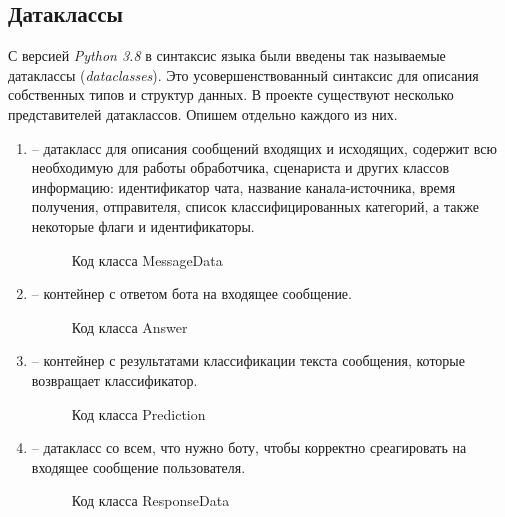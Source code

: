     \subsection{Датаклассы}
    С версией \textit{Python 3.8} в синтаксис языка были введены так называемые
    датаклассы (\textit{dataclasses}).
    Это усовершенствованный синтаксис для описания собственных типов и структур данных.
    В проекте существуют несколько представителей датаклассов. Опишем отдельно каждого из них.
    \begin{enumerate}
        \item {} -- датакласс для описания сообщений входящих и исходящих,
        содержит всю необходимую для работы обработчика, сценариста и других классов информацию:
        идентификатор чата, название канала-источника, время получения, отправителя,
        список классифицированных категорий, а также некоторые флаги и идентификаторы.

        \begin{figure}[!h]
            \centering
            
            \caption{Код класса MessageData}
            \label{fig:messagedata}
        \end{figure}

        \item {} -- контейнер с ответом бота на входящее сообщение.

        \begin{figure}[!h]
            \centering
            
            \caption{Код класса Answer}
            \label{fig:answer}
        \end{figure}

        \item {} -- контейнер с результатами классификации текста сообщения,
        которые возвращает классификатор.

        \begin{figure}[!h]
            \centering
            
            \caption{Код класса Prediction}
            \label{fig:prediction}
        \end{figure}

        \item {} -- датакласс со всем, что нужно боту, чтобы корректно
        среагировать на входящее сообщение пользователя.

        \begin{figure}[!h]
            \centering
            
            \caption{Код класса ResponseData}
            \label{fig:responsedata}
        \end{figure}

    \end{enumerate}

